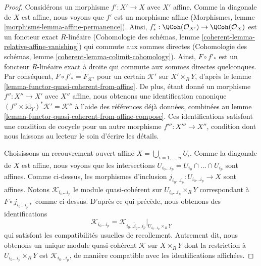 \begin{proof}
Considérons un morphisme $f' : X' \to X$ avec $X'$ affine. Comme la
diagonale de $X$ est affine, nous voyons que $f'$ est un morphisme affine
(Morphismes, lemme \ref{morphisms-lemma-affine-permanence}).
Ainsi, $f'_* : \QCoh(\mathcal{O}_{X'}) \to \QCoh(\mathcal{O}_X)$
est un foncteur exact $R$-linéaire
(Cohomologie des schémas, lemme \ref{coherent-lemma-relative-affine-vanishing})
qui commute aux sommes directes
(Cohomologie des schémas, lemme \ref{coherent-lemma-colimit-cohomology}).
Ainsi, $F \circ f'_*$ est un foncteur $R$-linéaire exact à droite qui commute
aux sommes directes quelconques. Par conséquent,
$F \circ f'_* = F_{\mathcal{K}'}$ pour un certain $\mathcal{K}'$
sur $X' \times_R Y$, d'après le lemme \ref{lemma-functor-quasi-coherent-from-affine}.
De plus, étant donné un morphisme $f'' : X'' \to X'$ avec $X''$ affine,
nous obtenons une identification canonique
$(f'' \times \text{id}_Y)^*\mathcal{K}' = \mathcal{K}''$
à l'aide des références déjà données, combinées au
lemme \ref{lemma-functor-quasi-coherent-from-affine-compose}.
Ces identifications satisfont une condition de cocycle pour
un autre morphisme $f''' : X''' \to X''$, condition dont nous laissons
au lecteur le soin d'écrire les détails.

\medskip\noindent
Choisissons un recouvrement ouvert affine $X = \bigcup_{i = 1, \ldots, n} U_i$.
Comme la diagonale de $X$ est affine, nous voyons que les intersections
$U_{i_0 \ldots i_p} = U_{i_0} \cap \ldots \cap U_{i_p}$ sont affines.
Comme ci-dessus, les morphismes d'inclusion
$j_{i_0 \ldots i_p} : U_{i_0 \ldots i_p} \to X$ sont affines.
Notons $\mathcal{K}_{i_0 \ldots i_p}$ le module quasi-cohérent
sur $U_{i_0 \ldots i_p} \times_R Y$ correspondant à
$F \circ j_{i_0 \ldots i_p *}$ comme ci-dessus.
D'après ce qui précède, nous obtenons des identifications
$$
\mathcal{K}_{i_0 \ldots i_p} =
\mathcal{K}_{i_0 \ldots \hat i_j \ldots i_p}|_{U_{i_0 \ldots i_p} \times_R Y}
$$
qui satisfont les compatibilités usuelles de recollement. Autrement dit, nous obtenons
un unique module quasi-cohérent $\mathcal{K}$ sur $X \times_R Y$
dont la restriction à $U_{i_0 \ldots i_p} \times_R Y$ est
$\mathcal{K}_{i_0 \ldots i_p}$, de manière compatible avec les identifications affichées.


\end{proof}

